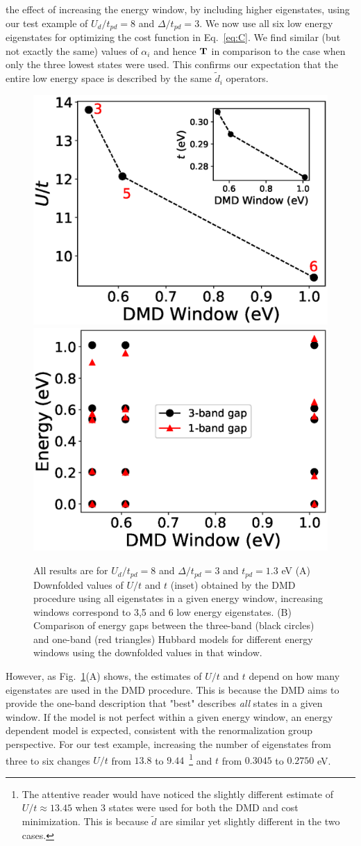the effect of increasing the energy window, by including higher eigenstates, using our 
test example of $U_d/t_{pd}=8$ and $\Delta/t_{pd}=3$. We now use all six low energy eigenstates 
for optimizing the cost function in Eq.~\ref{eq:C}. We 
find similar (but not exactly the same) values of $\alpha_i$ and hence ${\bf T}$ in comparison to 
the case when only the three lowest states were used. This confirms our expectation that the entire 
low energy space is described by the same $\tilde{d}_i$ operators. 
\begin{figure}
\centering
\includegraphics[width=0.49\linewidth]{./Figures/downfolded_params_diffwindows_ep_3.eps}
\includegraphics[width=0.49\linewidth]{./Figures/lowenergygaps_diffwindows_ep_3.eps}
\caption{All results are for $U_d/t_{pd}=8$ and $\Delta/t_{pd}=3$ and $t_{pd}=1.3$ eV 
(A) Downfolded values of $U/t$ and $t$ (inset) obtained by the DMD procedure using all eigenstates 
in a given energy window, increasing windows correspond to 3,5 and 6 low energy eigenstates. 
(B) Comparison of energy gaps between the three-band (black circles) and one-band (red triangles) 
Hubbard models for different energy windows using the downfolded values in that window.}
\label{fig:windows} 
\end{figure}	

However, as Fig.~\ref{fig:windows}(A) shows, the estimates of $U/t$ and $t$ depend on how many eigenstates 
are used in the DMD procedure. This is because the DMD aims to provide the one-band description 
that "best" describes \textit{all} states in a given window. If the model is not perfect within a given energy window, 
an energy dependent model is expected, consistent with the renormalization group perspective. For our test example, 
increasing the number of eigenstates from three to six changes $U/t$ from $13.8$ to $9.44$~\footnote{The attentive reader 
would have noticed the slightly different estimate of $U/t\approx 13.45$ when 3 states were used for both the DMD and cost minimization. 
This is because $\tilde{d}$ are similar yet slightly different in the two cases.} and $t$ from $0.3045$ to $0.2750$ eV. 

